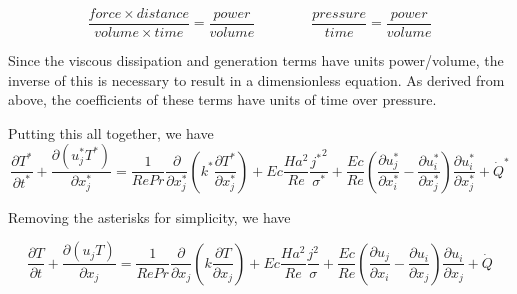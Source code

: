 \documentclass[11pt]{article}
\begin{document}
\begin{equation}
	\frac{force \times distance}{volume \times time} = \frac{power}{volume}
	\qquad \qquad
	\frac{pressure}{time} = \frac{power}{volume}
\end{equation}

Since the viscous dissipation and generation terms have units power/volume, the inverse of this is necessary to result in a dimensionless equation. As derived from above, the coefficients of these terms have units of time over pressure.

Putting this all together, we have
\begin{equation}
	\frac{\partial T^*}{\partial t^*} +
	\frac{\partial (u_j^* T^*)}{\partial x_j^*}
	= 
	\frac{1}{Re Pr}
	\frac{\partial}{\partial x_j^*}
	\left( 
	k^* \frac{\partial T^*}{\partial x_j^*}
	\right) + 
	Ec \frac{Ha^2}{Re}
	\frac{{j^*}^2}{\sigma^*} +
	\frac{Ec}{Re}
	\left(
	\frac{\partial u_j^*}{\partial x_i^*}
	-
	\frac{\partial u_i^*}{\partial x_j^*}
	\right)
	\frac{\partial u_i^*}{\partial x_j^*} +
	\dot{Q}^*
\end{equation}

Removing the asterisks for simplicity, we have

\begin{equation}
	\frac{\partial T}{\partial t} +
	\frac{\partial (u_j T)}{\partial x_j}
	= 
	\frac{1}{Re Pr}
	\frac{\partial}{\partial x_j}
	\left( 
	k \frac{\partial T}{\partial x_j}
	\right) + 
	Ec \frac{Ha^2}{Re}
	\frac{{j}^2}{\sigma} +
	\frac{Ec}{Re}
	\left(
	\frac{\partial u_j}{\partial x_i}
	-
	\frac{\partial u_i}{\partial x_j}
	\right)
	\frac{\partial u_i}{\partial x_j} +
	\dot{Q}
\end{equation}





\end{document}

